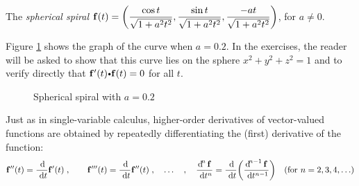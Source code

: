 \begin{exa}\label{exa:sphspiral}
 The \emph{spherical spiral}
 $\mathbf{ f}(t) = \biggl( \dfrac{\cos t}{\sqrt{1 + a^2 t^2}},\dfrac{\sin 
t}{\sqrt{1 + a^2 t^2}},
  \dfrac{-at}{\sqrt{1 + a^2 t^2}} \biggr)$, for $a \ne 0$.\vspace{1.5mm}
  \par\noindent Figure \ref{fig:sphspiral} shows the graph of the curve when $a 
= 0.2$. In the exercises, the reader will be asked to
  show that this curve lies on the sphere $x^2 + y^2 + z^2 = 1$ and to verify 
directly that
  $\Dotprod{\funvect{f}'(t)}{\funvect{f}(t)} = 0$ for all $t$.
  
 \begin{figure}[h]
  \begin{center}
   
  \end{center}
 \caption[]{\quad Spherical spiral with $a = 0.2$}
 \label{fig:sphspiral}
 \end{figure}
\end{exa}\vspace{-4mm}

Just as in single-variable calculus, higher-order derivatives of vector-valued 
functions are obtained by repeatedly
differentiating the (first) derivative of the function:
\begin{displaymath}
 \funvect{f}''(t) = \dfrac{\d}{\dt} \funvect{f}'(t) \; , \qquad 
\funvect{f}'''(t) = \dfrac{\d}{\dt} \funvect{f}''(t) \;
 , \quad \ldots \quad , \quad \dfrac{\d^{n}\funvect{f}}{\dt^{n}} =
 \dfrac{\d}{\dt} \biggl( \dfrac{\d^{n-1}\funvect{f}}{\dt^{n-1}} \biggr) 
\text{~~~(for $n = 2, 3, 4,\ldots$)}
\end{displaymath}

